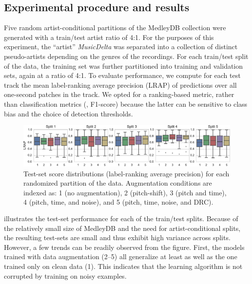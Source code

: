 \documentclass{article}
\begin{document}
\subsection{Experimental procedure and results}

Five random artist-conditional partitions of the MedleyDB collection were generated with
a train/test artist ratio of 4:1.  For the purposes of this experiment,
the ``artist'' \emph{MusicDelta} was separated into a collection of distinct pseudo-artists
depending on the genres of the recordings.
For each train/test split of the data, the training set was further partitioned into
training and validation sets, again at a ratio of 4:1.
To evaluate performance, we compute for each test track the mean label-ranking average
precision (LRAP) of predictions over all one-second patches in the track.  We opted for
a ranking-based metric, rather than classification metrics (\eg, F1-score) because the
latter can be sensitive to class bias and the choice of detection thresholds.

\begin{figure}[ht]
    \centering
    \includegraphics[width=\textwidth]{figs/lrap}
    \caption{Test-set score distributions (label-ranking average precision) for each
        randomized partition of the data.
        Augmentation conditions are indexed as: 1 (no augmentation), 2 (pitch-shift), 3
        (pitch and time), 4 (pitch, time, and noise), and 5 (pitch, time, noise, and
        DRC).\label{lrapresults}}
\end{figure}

 illustrates the test-set performance for each of the train/test
splits.  Because of the relatively small size of MedleyDB and the need for
artist-conditional splits, the resulting test-sets are small and thus exhibit high
variance across splits.  However, a few trends can be readily observed from the figure.
First, the models trained with data augmentation (2--5) all generalize at least as well
as the one trained only on clean data (1).  This indicates that the learning algorithm is
not corrupted by training on noisy examples.
\end{document}
